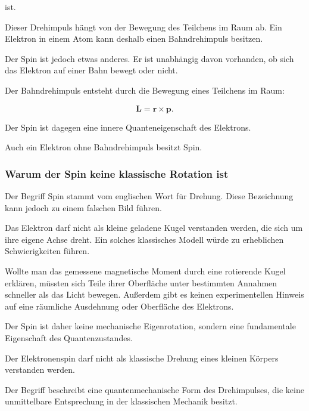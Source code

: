 ist.

Dieser Drehimpuls hängt von der Bewegung des Teilchens im Raum ab. Ein
Elektron in einem Atom kann deshalb einen Bahndrehimpuls besitzen.

Der Spin ist jedoch etwas anderes. Er ist unabhängig davon vorhanden,
ob sich das Elektron auf einer Bahn bewegt oder nicht.

\begin{DidacticBox}
	\label{box:bahndrehimpuls_und_spin}
	
	Der Bahndrehimpuls entsteht durch die Bewegung eines Teilchens im
	Raum:
	
	\begin{equation}
		\mathbf{L}
		=
		\mathbf{r}\times\mathbf{p}.
	\end{equation}
	
	Der Spin ist dagegen eine innere Quanteneigenschaft des Elektrons.
	
	Auch ein Elektron ohne Bahndrehimpuls besitzt Spin.
\end{DidacticBox}

\subsubsection*{Warum der Spin keine klassische Rotation ist}

Der Begriff Spin stammt vom englischen Wort für Drehung. Diese
Bezeichnung kann jedoch zu einem falschen Bild führen.

Das Elektron darf nicht als kleine geladene Kugel verstanden werden,
die sich um ihre eigene Achse dreht. Ein solches klassisches Modell
würde zu erheblichen Schwierigkeiten führen.

Wollte man das gemessene magnetische Moment durch eine rotierende
Kugel erklären, müssten sich Teile ihrer Oberfläche unter bestimmten
Annahmen schneller als das Licht bewegen. Außerdem gibt es keinen
experimentellen Hinweis auf eine räumliche Ausdehnung oder Oberfläche
des Elektrons.

Der Spin ist daher keine mechanische Eigenrotation, sondern eine
fundamentale Eigenschaft des Quantenzustandes.

\begin{DidacticBox}
	\label{box:spin_keine_klassische_rotation}
	
	Der Elektronenspin darf nicht als klassische Drehung eines kleinen
	Körpers verstanden werden.
	
	Der Begriff beschreibt eine quantenmechanische Form des Drehimpulses,
	die keine unmittelbare Entsprechung in der klassischen Mechanik
	besitzt.
\end{DidacticBox}

